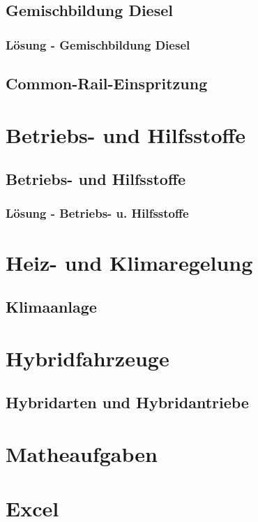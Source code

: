 \chapter{Gemischbildung Diesel}

\section{Lösung - Gemischbildung Diesel}

\chapter{Common-Rail-Einspritzung}



\part{Betriebs- und Hilfsstoffe}

\chapter{Betriebs- und Hilfsstoffe}
 \newpage
\section{Lösung - Betriebs- u. Hilfsstoffe}
 \newpage




\part{Heiz- und Klimaregelung}

\chapter{Klimaanlage}
 



\part{Hybridfahrzeuge}

\chapter{Hybridarten und Hybridantriebe}





\part{Matheaufgaben}
 \newpage
 \newpage



\part{Excel}

